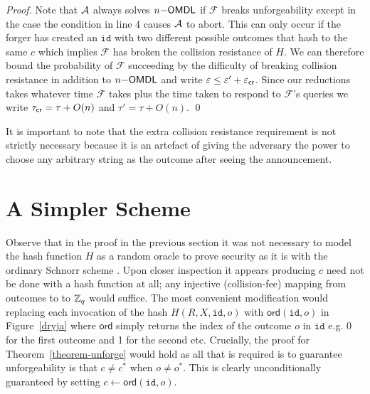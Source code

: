 \documentclass[runningheads]{llncs}
\newcommand{\eventid}{\mathtt{id}}
\newcommand{\F}{\mathcal{F}}
\begin{document}
\begin{proof}
    Note that $\mathcal{A}$ always solves $n\mathsf{-OMDL}$ if $\F$ breaks unforgeability except in the case the condition in line 4 causes $\mathcal{A}$ to abort.
    This can only occur if the forger has created an $\eventid$ with two different possible outcomes that hash to the same $c$ which implies $\F$ has broken the collision resistance of $H$.
    We can therefore bound the probability of $\F$ succeeding by the difficulty of breaking collision resistance in addition to $n\mathsf{-OMDL}$ and write $\varepsilon \leq \varepsilon' + \varepsilon_{\mathsf{cr}}$.
    Since our reductions takes whatever time $\F$ takes plus the time taken to respond to $\F$'s queries we write $\tau_{\mathsf{cr}} = \tau + O(n)$ and $\tau' = \tau + O(n)$.
\qed
\end{proof}

It is important to note that the extra collision resistance requirement is not strictly necessary because it is an artefact of giving the adversary the power to choose any arbitrary string as the outcome after seeing the announcement.


\section{A Simpler Scheme}
\label{simple}
\newcommand{\ord}{\mathsf{ord}}

Observe that in the proof in the previous section it was not necessary to model the hash function $H$ as a random oracle to prove security as it is with the ordinary Schnorr scheme \cite{pointcheval2000security}.
Upon closer inspection it appears producing $c$ need not be done with a hash function at all; any injective (collision-fee) mapping from outcomes to to $\mathbb{Z}_q$ would suffice.
The most convenient modification would replacing each invocation of the hash $H(R, X, \eventid, o)$  with $\ord(\eventid,o)$ in Figure~\ref{dryja} where $\ord$ simply returns the index of the outcome $o$ in $\eventid$ e.g. 0 for the first outcome and 1 for the second etc.
Crucially, the proof for Theorem~\ref{theorem-unforge} would hold as all that is required is to guarantee unforgeability is that $c \neq c^*$ when $o \neq o^{*}$.
This is clearly unconditionally guaranteed by setting $c \gets \ord(\eventid, o)$.
\end{document}
